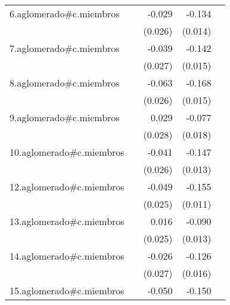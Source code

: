{\begin{longtable}{l*{4}{D{.}{.}{-1}}}
\addlinespace
6.aglomerado#c.miembros&                     &      -0.029         &      -0.134\sym{***}&                     \\
            &                     &     (0.026)         &     (0.014)         &                     \\
\addlinespace
7.aglomerado#c.miembros&                     &      -0.039         &      -0.142\sym{***}&                     \\
            &                     &     (0.027)         &     (0.015)         &                     \\
\addlinespace
8.aglomerado#c.miembros&                     &      -0.063\sym{*}  &      -0.168\sym{***}&                     \\
            &                     &     (0.026)         &     (0.015)         &                     \\
\addlinespace
9.aglomerado#c.miembros&                     &       0.029         &      -0.077\sym{***}&                     \\
            &                     &     (0.028)         &     (0.018)         &                     \\
\addlinespace
10.aglomerado#c.miembros&                     &      -0.041         &      -0.147\sym{***}&                     \\
            &                     &     (0.026)         &     (0.013)         &                     \\
\addlinespace
12.aglomerado#c.miembros&                     &      -0.049\sym{*}  &      -0.155\sym{***}&                     \\
            &                     &     (0.025)         &     (0.011)         &                     \\
\addlinespace
13.aglomerado#c.miembros&                     &       0.016         &      -0.090\sym{***}&                     \\
            &                     &     (0.025)         &     (0.013)         &                     \\
\addlinespace
14.aglomerado#c.miembros&                     &      -0.026         &      -0.126\sym{***}&                     \\
            &                     &     (0.027)         &     (0.016)         &                     \\
\addlinespace
15.aglomerado#c.miembros&                     &      -0.050         &      -0.150\sym{***}&                     \\

\end{longtable}}
